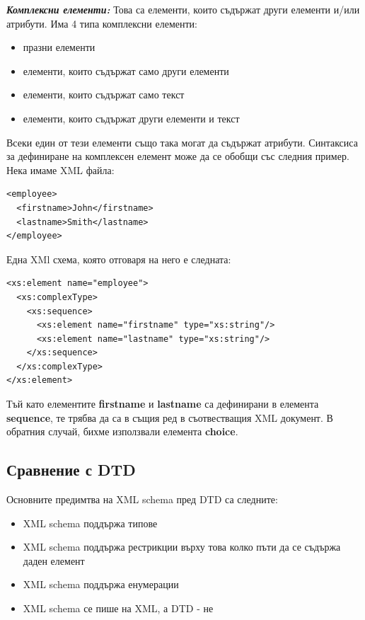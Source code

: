 \documentclass[11pt]{article} %
\begin{document}
\textit{\textbf{Комплексни елементи: }} Това са елементи, които съдържат други елементи и/или атрибути. Има 4 типа комплексни елементи:\\
\begin{itemize}[noitemsep]
	\item празни елементи
	\item елементи, които съдържат само други елементи
	\item елементи, които съдържат само текст
	\item елементи, които съдържат други елементи и текст 
\end{itemize}
Всеки един от тези елементи също така могат да съдържат атрибути. Синтаксиса за дефиниране на комплексен елемент може да се обобщи със следния пример. Нека имаме XML файла:
\begin{verbatim}
<employee>
  <firstname>John</firstname>
  <lastname>Smith</lastname>
</employee>
\end{verbatim}
Една XMl схема, която отговаря на него е следната:
\begin{verbatim}
<xs:element name="employee">
  <xs:complexType>
    <xs:sequence>
      <xs:element name="firstname" type="xs:string"/>
      <xs:element name="lastname" type="xs:string"/>
    </xs:sequence>
  </xs:complexType>
</xs:element>
\end{verbatim}
Тъй като елементите \textbf{firstname} и \textbf{lastname} са дефинирани в елемента \textbf{sequence}, те трябва да са в същия ред в съотвестващия XML документ. В обратния случай, бихме използвали елемента \textbf{choice}.

\subsection{Сравнение с DTD}
Основните предимтва на XML schema пред DTD са следните:
\begin{itemize}[noitemsep]
	\item XML schema поддържа типове
	\item XML schema поддържа рестрикции върху това колко пъти да се съдържа даден елемент
	\item XML schema поддържа енумерации
	\item XML schema се пише на XML, а DTD - не
\end{itemize}
\end{document}

